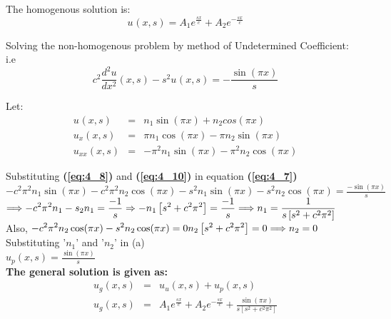 \documentclass[12pt]{report}
\newcommand{\Un}[2]{u_{#1}(#2)}
\newcommand{\NI}{\noindent}
\newcommand{\psq}{\pi^{2}}
\newcommand{\bt}[1]{\textbf{#1}}
\newcommand{\refn}[1]{\bt{(\ref{#1})}}
\begin{document}
\NI The homogenous solution is: 
\begin{equation}
	\Un{}{x,s} = A_1 e^{\frac{sx}{c}} + A_2 e^{-\frac{sx}{c}}
\end{equation}

\NI Solving the non-homogenous problem by method of Undetermined Coefficient: \\ i.e
\begin{equation}
	c^2 \frac{d^2 u}{d x^2}(x,s) - s^2 \Un{}{x,s} = - \frac{\sin(\pi x)}{s} \label{eq:4_7}
\end{equation}

\NI Let:
\begin{eqnarray}
	\Un{}{x,s} &=& n_1 \sin(\pi x) + n_2 cos(\pi x) \label{eq:4_8}\\
	\Un{x}{x,s} &=& \pi n_1 \cos(\pi x) - \pi n_2 \sin(\pi x)\label{eq:4_9} \\
	\Un{xx}{x,s} &=& -\psq n_1 \sin(\pi x) - \psq n_2 \cos(\pi x)\label{eq:4_10}
\end{eqnarray}

\NI Substituting \refn{eq:4_8} and \refn{eq:4_10} in equation \refn{eq:4_7}\\
${\displaystyle -c^{2}\psq n_{1}\sin(\pi x) - c^{2}\psq n_{2}\cos(\pi x) - s^{2}n_{1}\sin(\pi x) -  s^{2}n_{2}\cos(\pi x) = \frac{-\sin(\pi x)}{s}}$\\[0.2cm]
$ \Longrightarrow \displaystyle -c^{2}\psq n_{1} - s_{2}n_{1}  = \frac{-1}{s} \Rightarrow -n_{1}\left[s^{2} + c^{2}\psq \right] = \frac{-1}{s} \\ 
\Longrightarrow n_{1} = \frac{1}{s\left[s^{2} + c^{2}\psq \right]}
$\\[0.2cm]

\NI Also, 
$
\displaystyle -c^{2}\psq n_{2}\cos(\pi x) - s^{2}n_{2}\cos(\pi x) = 0 \\[0.2cm]
n_2\left[s^{2} + c^{2}\psq \right] = 0 \\[0.2cm] 
\Longrightarrow n_{2} = 0 \\
$\\[0.2cm]

\NI Substituting '$n_{1}$' and '$n_{2}$' in (a)\\[0.2cm]
$ \displaystyle
\Un{p}{x,s} = \frac{\sin(\pi x)}{s}
$\\[0.2cm]

\NI \textbf{The general solution is given as:}\\[0.2cm]
\begin{eqnarray}
	\Un{g}{x,s} &=& \Un{u}{x,s} + \Un{p}{x,s} \nonumber\\[0.2cm]
	\Un{g}{x,s} &=& A_{1}e^{\frac{sx}{c}} + A_{2}e^{-\frac{sx}{c}} + \frac{\sin(\pi x)}{s\left[ s^{2} + c^{2}\psq \right]}  \label{eq:4_11}	
\end{eqnarray}
\end{document}
